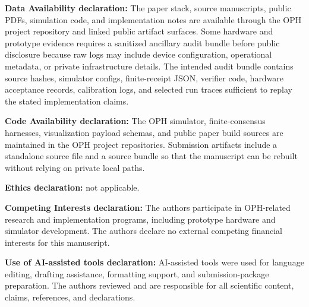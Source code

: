 \documentclass[11pt]{article}
\begin{document}
\noindent\textbf{Data Availability declaration:} The paper stack, source manuscripts, public
PDFs, simulation code, and implementation notes are available through the OPH project
repository and linked public artifact surfaces. Some hardware and prototype evidence requires a
sanitized ancillary audit bundle before public disclosure because raw logs may include device
configuration, operational metadata, or private infrastructure details. The intended audit bundle
contains source hashes, simulator configs, finite-receipt JSON, verifier code, hardware acceptance
records, calibration logs, and selected run traces sufficient to replay the stated implementation
claims.

\noindent\textbf{Code Availability declaration:} The OPH simulator, finite-consensus harnesses,
visualization payload schemas, and public paper build sources are maintained in the OPH project
repositories. Submission artifacts include a standalone source file and a source bundle so that the
manuscript can be rebuilt without relying on private local paths.

\noindent\textbf{Ethics declaration:} not applicable.

\noindent\textbf{Competing Interests declaration:} The authors participate in OPH-related research
and implementation programs, including prototype hardware and simulator development. The authors
declare no external competing financial interests for this manuscript.

\noindent\textbf{Use of AI-assisted tools declaration:} AI-assisted tools were used for language
editing, drafting assistance, formatting support, and submission-package preparation. The authors
reviewed and are responsible for all scientific content, claims, references, and declarations.
\end{document}
